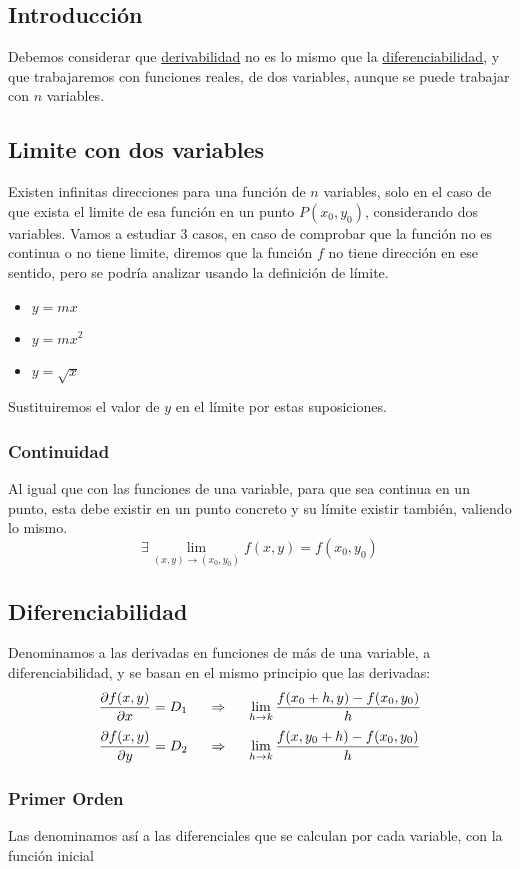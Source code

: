 \subsection{Introducción}
 Debemos considerar que \underline{derivabilidad} no es lo mismo que la \underline{diferenciabilidad}, y que trabajaremos con funciones reales, de dos variables, aunque se puede trabajar con \(n\) variables.
\subsection{Limite con dos variables}
 Existen infinitas direcciones para una función de \(n\) variables, solo en el caso de que exista el limite de esa función en un punto \(P(x_0,y_0)\), considerando dos variables. Vamos a estudiar 3 casos, en caso de comprobar que la función no es continua o no tiene limite, diremos que la función \(f\) no tiene dirección en ese sentido, pero se podría analizar usando la definición de límite.
\begin{itemize}
        \item \(y = mx\)
        \item \(y = mx^2\)
        \item \(y = \sqrt{x}\)
\end{itemize}
 Sustituiremos el valor de \(y\) en el límite por estas suposiciones.
\subsubsection{Continuidad}
 Al igual que con las funciones de una variable, para que sea continua en un punto, esta debe existir en un punto concreto y su límite existir también, valiendo lo mismo.
\[
        \boxed{\exists \lim_{(x,y) \rightarrow  (x_0,y_0)}f(x,y) = f(x_0,y_0)}
\]
\subsection{Diferenciabilidad}
 Denominamos a las derivadas en funciones de más de una variable, a diferenciabilidad, y se basan en el mismo principio que las derivadas:
\[
        \frac{\partial f(x,y)}{\partial x} =D_1 \hspace{.5cm}\Rightarrow  \hspace{.5cm}\lim_{h\rightarrow k} \frac{f(x_0+h,y)-f(x_0,y_0)}{h}
\]
\[
        \frac{\partial f(x,y)}{\partial y} =D_2 \hspace{.5cm}\Rightarrow  \hspace{.5cm}\lim_{h\rightarrow k} \frac{f(x,y_0+h)-f(x_0,y_0)}{h}
\]
\subsubsection{Primer Orden}
 Las denominamos así a las diferenciales que se calculan por cada variable, con la función inicial
